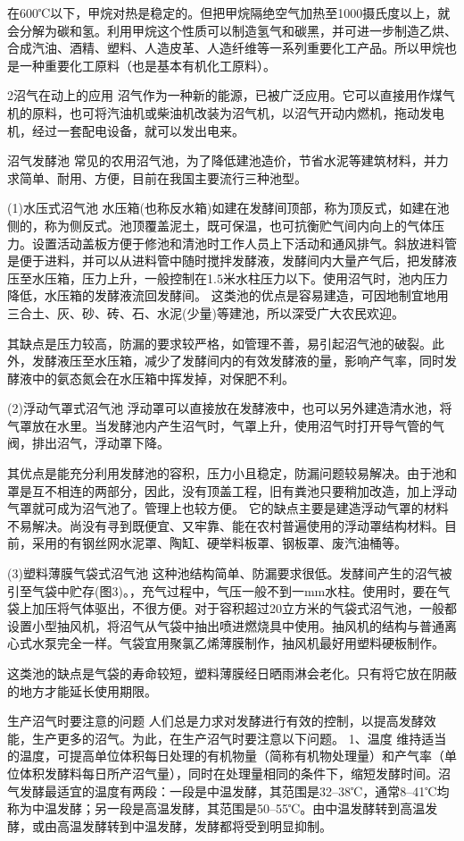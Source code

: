 \documentclass{ctexbook}
\begin{document}
在600℃以下，甲烷对热是稳定的。但把甲烷隔绝空气加热至1000摄氏度以上，就会分解为碳和氢。利用甲烷这个性质可以制造氢气和碳黑，并可进一步制造乙烘、合成汽油、酒精、塑料、人造皮革、人造纤维等一系列重要化工产品。所以甲烷也是一种重要化工原料（也是基本有机化工原料）。

2沼气在动上的应用
沼气作为一种新的能源，已被广泛应用。它可以直接用作煤气机的原料，也可将汽油机或柴油机改装为沼气机，以沼气开动内燃机，拖动发电机，经过一套配电设备，就可以发出电来。

沼气发酵池
常见的农用沼气池，为了降低建池造价，节省水泥等建筑材料，并力求简单、耐用、方便，目前在我国主要流行三种池型。

(1)水压式沼气池
水压箱(也称反水箱)如建在发酵间顶部，称为顶反式，如建在池侧的，称为侧反式。池顶覆盖泥土，既可保温，也可抗衡贮气间内向上的气体压力。设置活动盖板方便于修池和清池时工作人员上下活动和通风排气。斜放进料管是便于进料，并可以从进料管中随时搅拌发酵液，发酵间内大量产气后，把发酵液压至水压箱，压力上升，一般控制在1.5米水柱压力以下。使用沼气时，池内压力降低，水压箱的发酵液流回发酵间。
这类池的优点是容易建造，可因地制宜地用三合土、灰、砂、砖、石、水泥(少量)等建池，所以深受广大农民欢迎。

其缺点是压力较高，防漏的要求较严格，如管理不善，易引起沼气池的破裂。此外，发酵液压至水压箱，减少了发酵间内的有效发酵液的量，影响产气率，同时发酵液中的氨态氮会在水压箱中挥发掉，对保肥不利。

(2)浮动气罩式沼气池
浮动罩可以直接放在发酵液中，也可以另外建造清水池，将气罩放在水里。当发酵池内产生沼气时，气罩上升，使用沼气时打开导气管的气阀，排出沼气，浮动罩下降。

其优点是能充分利用发酵池的容积，压力小且稳定，防漏问题较易解决。由于池和罩是互不相连的两部分，因此，没有顶盖工程，旧有粪池只要稍加改造，加上浮动气罩就可成为沼气池了。管理上也较方便。
它的缺点主要是建造浮动气罩的材料不易解决。尚没有寻到既便宜、又牢靠、能在农村普遍使用的浮动罩结构材料。目前，采用的有钢丝网水泥罩、陶缸、硬举料板罩、钢板罩、废汽油桶等。

(3)塑料薄膜气袋式沼气池
这种池结构简单、防漏要求很低。发酵间产生的沼气被引至气袋中贮存(图3)。，充气过程中，气压一般不到一mm水柱。使用时，要在气袋上加压将气体驱出，不很方便。对于容积超过20立方米的气袋式沼气池，一般都设置小型抽风机，将沼气从气袋中抽出喷进燃烧具中使用。抽风机的结构与普通离心式水泵完全一样。气袋宜用聚氯乙烯薄膜制作，抽风机最好用塑料硬板制作。

这类池的缺点是气袋的寿命较短，塑料薄膜经日晒雨淋会老化。只有将它放在阴蔽的地方才能延长使用期限。

生产沼气时要注意的问题
人们总是力求对发酵进行有效的控制，以提高发酵效能，生产更多的沼气。为此，在生产沼气时要注意以下问题。
1、温度	
维持适当的温度，可提高单位体积每日处理的有机物量（简称有机物处理量）和产气率（单位体积发酵料每日所产沼气量），同时在处理量相同的条件下，缩短发酵时间。沼气发酵最适宜的温度有两段：一段是中温发酵，其范围是32--38℃，通常8--41℃均称为中温发酵；另一段是高温发酵，其范围是50--55℃。由中温发酵转到高温发酵，或由高温发酵转到中温发酵，发酵都将受到明显抑制。
\end{document}
